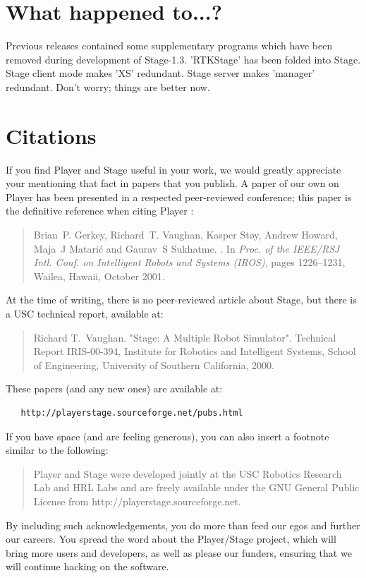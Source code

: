 \documentclass[11pt,twoside]{report}
\def\VERSION {1.3}
\begin{document}
  \section{What happened to...?}
	
	Previous releases contained some supplementary programs which
	have been removed during development of
	Stage-\VERSION. 'RTKStage' has been folded into Stage. Stage
	client mode makes 'XS' redundant. Stage server makes 'manager'
	redundant. Don't worry; things are better now.

\section{Citations}
If you find Player and Stage useful in your work, we would greatly
appreciate your mentioning that fact in papers that you publish.  A
paper of our own on Player has been presented in a respected
peer-reviewed conference; this paper is the definitive reference when
citing Player \cite{GerkeyVaughan01a}:
\begin{quote}
Brian~P. Gerkey, Richard~T. Vaughan, Kasper St\o{}y, Andrew Howard,
Maja~J Matari\'c and Gaurav~S Sukhatme.
.
\newblock In {\em Proc. of the IEEE/RSJ Intl. Conf. on Intelligent Robots and
  Systems (IROS)}, pages 1226--1231, Wailea, Hawaii, October 2001.
\end{quote}

At the time of writing, there is no peer-reviewed article about Stage,
but there is a USC technical report, available at:

\begin{quote}
Richard T.~Vaughan. "Stage: A Multiple Robot Simulator". Technical Report IRIS-00-394, Institute for Robotics and Intelligent Systems, School of Engineering, University of Southern California, 2000.
\end{quote}

These papers (and any new ones) are available at: 

\begin{verbatim}
   http://playerstage.sourceforge.net/pubs.html
\end{verbatim}

If you have space (and are feeling generous), you can also insert a footnote
similar to the following:
\begin{quote}
Player and Stage were developed jointly at the USC Robotics Research
Lab and HRL Labs and are freely available under the GNU General Public
License from http://playerstage.sourceforge.net.
\end{quote}
By including such acknowledgements, you do more than feed our egos and
further our careers.  You spread the word about the Player/Stage
project, which will bring more users and developers, as well as please
our funders, ensuring that we will continue hacking on the software.
\end{document}

